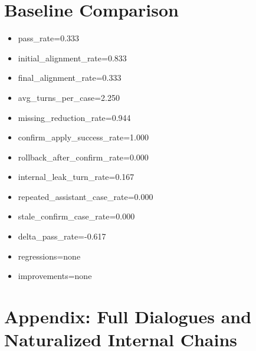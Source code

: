 \documentclass[11pt]{ctexart}
\begin{document}
\section{Baseline Comparison}
\begin{itemize}
\item pass\_rate=0.333
\item initial\_alignment\_rate=0.833
\item final\_alignment\_rate=0.333
\item avg\_turns\_per\_case=2.250
\item missing\_reduction\_rate=0.944
\item confirm\_apply\_success\_rate=1.000
\item rollback\_after\_confirm\_rate=0.000
\item internal\_leak\_turn\_rate=0.167
\item repeated\_assistant\_case\_rate=0.000
\item stale\_confirm\_case\_rate=0.000
\item delta\_pass\_rate=-0.617
\item regressions=none
\item improvements=none
\end{itemize}
\appendix
\section{Appendix: Full Dialogues and Naturalized Internal Chains}
\end{document}
